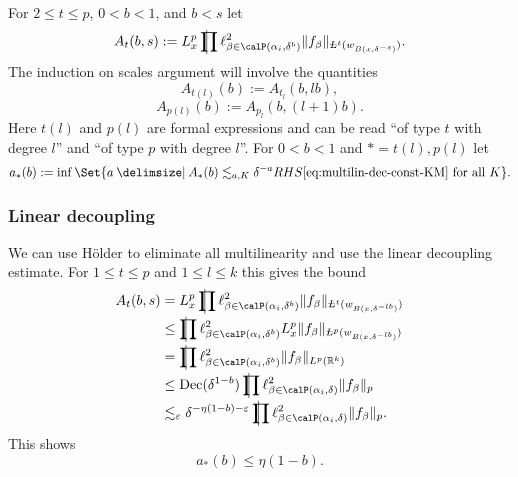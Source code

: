 For $2 \leq t \leq p$, $0<b<1$, and $b<s$ let
\begin{equation}
\label{eq:A}
A_{t} (b, s)
:=
L^{p}_{x} \avprod \ell^{2}_{\beta \in \Part[\alpha_i]{\delta^{b}}} \norm{f_{\beta}}_{\avL^t(w_{B(x,\delta^{-s})})}.
\end{equation}
The induction on scales argument will involve the quantities
\[
A_{t(l)}(b) := A_{t_{l}}(b,lb),
\]
\[
A_{p(l)}(b) := A_{p_{l}}(b,(l+1)b).
\]
Here $t(l)$ and $p(l)$ are formal expressions and can be read ``of type $t$ with degree $l$'' and ``of type $p$ with degree $l$''.
For $0<b<1$ and $*=t(l),p(l)$ let
\[
a_{*}(b) := \inf \Set{ a \given A_{*}(b) \lesssim_{a,K} \delta^{-a} RHS\eqref{eq:multilin-dec-const-KM} \text{ for all } K }.
\]

\subsubsection{Linear decoupling}
We can use H\"older to eliminate all multilinearity and use the linear decoupling estimate.
For $1 \leq t \leq p$ and $1 \leq l \leq k$ this gives the bound
\begin{equation}
\label{eq:A<prod}
\begin{split}
A_{t}(b,s)
&=
L^{p}_{x} \avprod \ell^{2}_{\beta \in \Part[\alpha_{i}]{\delta^{b}}} \norm{ f_{\beta} }_{\avL^{t}(w_{B(x,\delta^{-lb})})}
\\ &\leq
\avprod \ell^{2}_{\beta \in \Part[\alpha_{i}]{\delta^{b}}} L^{p}_{x} \norm{ f_{\beta} }_{\avL^{p}(w_{B(x,\delta^{-lb})})}
\\ &=
\avprod \ell^{2}_{\beta \in \Part[\alpha_{i}]{\delta^{b}}} \norm{ f_{\beta} }_{L^{p}(\R^{k})}
\\ &\leq
\Dec(\delta^{1-b})
\avprod \ell^{2}_{\beta \in \Part[\alpha_{i}]{\delta}} \norm{ f_{\beta} }_{p}
\\ &\lesssim_{\epsilon}
\delta^{-\eta(1-b)-\epsilon}
\avprod \ell^{2}_{\beta \in \Part[\alpha_{i}]{\delta}} \norm{ f_{\beta} }_{p}.
\end{split}
\end{equation}
This shows
\begin{equation}
\label{eq:a*:linear-dec}
a_{*}(b) \leq \eta(1-b).
\end{equation}

